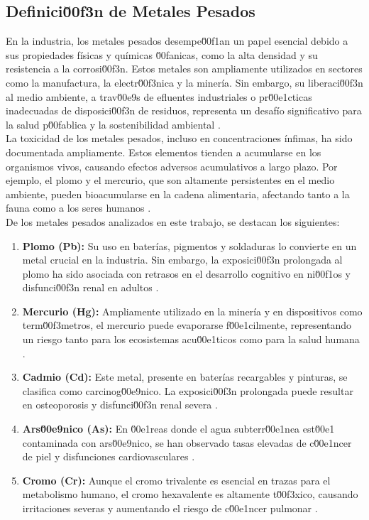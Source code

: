\subsection{Definici\u00f3n de Metales Pesados}

En la industria, los metales pesados desempe\u00f1an un papel esencial debido a sus propiedades físicas y químicas \u00fanicas, como la alta densidad y su resistencia a la corrosi\u00f3n. Estos metales son ampliamente utilizados en sectores como la manufactura, la electr\u00f3nica y la minería. Sin embargo, su liberaci\u00f3n al medio ambiente, a trav\u00e9s de efluentes industriales o pr\u00e1cticas inadecuadas de disposici\u00f3n de residuos, representa un desafío significativo para la salud p\u00fablica y la sostenibilidad ambiental \cite{sall2020, zaimee2021}.\\

La toxicidad de los metales pesados, incluso en concentraciones ínfimas, ha sido documentada ampliamente. Estos elementos tienden a acumularse en los organismos vivos, causando efectos adversos acumulativos a largo plazo. Por ejemplo, el plomo y el mercurio, que son altamente persistentes en el medio ambiente, pueden bioacumularse en la cadena alimentaria, afectando tanto a la fauna como a los seres humanos \cite{matthews2022, hughes2011}.\\

De los metales pesados analizados en este trabajo, se destacan los siguientes:

\begin{enumerate}
    \item \textbf{Plomo (Pb):} Su uso en baterías, pigmentos y soldaduras lo convierte en un metal crucial en la industria. Sin embargo, la exposici\u00f3n prolongada al plomo ha sido asociada con retrasos en el desarrollo cognitivo en ni\u00f1os y disfunci\u00f3n renal en adultos \cite{matthews2022, ding2021}.
    \item \textbf{Mercurio (Hg):} Ampliamente utilizado en la minería y en dispositivos como term\u00f3metros, el mercurio puede evaporarse f\u00e1cilmente, representando un riesgo tanto para los ecosistemas acu\u00e1ticos como para la salud humana \cite{sall2020, zhumanazar2022}.
    \item \textbf{Cadmio (Cd):} Este metal, presente en baterías recargables y pinturas, se clasifica como carcinog\u00e9nico. La exposici\u00f3n prolongada puede resultar en osteoporosis y disfunci\u00f3n renal severa \cite{rahimzadeh2017, park2022}.
    \item \textbf{Ars\u00e9nico (As):} En \u00e1reas donde el agua subterr\u00e1nea est\u00e1 contaminada con ars\u00e9nico, se han observado tasas elevadas de c\u00e1ncer de piel y disfunciones cardiovasculares \cite{hughes2011, truque2024}.
    \item \textbf{Cromo (Cr):} Aunque el cromo trivalente es esencial en trazas para el metabolismo humano, el cromo hexavalente es altamente t\u00f3xico, causando irritaciones severas y aumentando el riesgo de c\u00e1ncer pulmonar \cite{shin2023, park2022}.
\end{enumerate}

